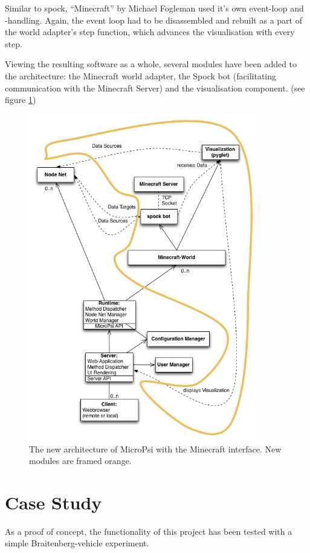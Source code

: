 Similar to spock, ``Minecraft'' by Michael Fogleman used it's own event-loop and -handling. Again, the event loop had to be disassembled and rebuilt as a part of the world adapter's step function, which advances the visualisation with every step.

Viewing the resulting software as a whole, several modules have been added to the architecture: the Minecraft world adapter, the Spock bot (facilitating communication with the Minecraft Server) and the visualisation component. (see figure \ref{uml_mc})

\begin{figure}[h]
  \centering
    \includegraphics[width=10cm]{graphics/UML_MicroPsi_mit_spock_und_rahmen}
  \caption{The new architecture of MicroPsi with the Minecraft interface. New modules are framed orange.}
  \label{uml_mc}
\end{figure}



    \section{Case Study}
As a proof of concept, the functionality of this project has been tested with a simple Braitenberg-vehicle experiment.